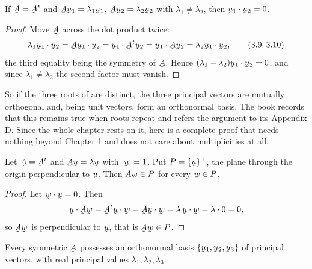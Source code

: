 \begin{theorem}[Orthogonality]\label{thm:orth}
If $\bA=\bA^{t}$ and $\bA\bu_{1}=\lambda_{1}\bu_{1}$,
$\bA\bu_{2}=\lambda_{2}\bu_{2}$ with $\lambda_{1}\neq\lambda_{2}$, then
$\ip{\bu_{1}}{\bu_{2}}=0$.
\end{theorem}

\begin{proof}
Move $\bA$ across the dot product twice:
\begin{equation}
   \lambda_{1}\ip{\bu_{1}}{\bu_{2}}
   =\ip{\bA\bu_{1}}{\bu_{2}}
   =\ip{\bu_{1}}{\bA^{t}\bu_{2}}
   =\ip{\bu_{1}}{\bA\bu_{2}}
   =\lambda_{2}\ip{\bu_{1}}{\bu_{2}},
   \tag{3.9--3.10}\label{eq:3.9}
\end{equation}
the third equality being the symmetry of $\bA$. Hence
$(\lambda_{1}-\lambda_{2})\ip{\bu_{1}}{\bu_{2}}=0$, and since
$\lambda_{1}\neq\lambda_{2}$ the second factor must vanish.
\end{proof}

So if the three roots of  are distinct, the three principal vectors
are mutually orthogonal and, being unit vectors, form an orthonormal basis.
The book records that this remains true when roots repeat and refers the
argument to its Appendix D. Since the whole chapter rests on it, here is a
complete proof that needs nothing beyond Chapter 1 and does not care about
multiplicities at all.

\begin{lemma}\label{lem:invariant}
Let $\bA=\bA^{t}$ and $\bA\bu=\lambda\bu$ with $|\bu|=1$. Put
$P=\{\bu\}^{\perp}$, the plane through the origin perpendicular to $\bu$.
Then $\bA\bw\in P$ for every $\bw\in P$.
\end{lemma}

\begin{proof}
Let $\ip\bw\bu=0$. Then
\[
   \ip{\bu}{\bA\bw}=\ip{\bA^{t}\bu}{\bw}=\ip{\bA\bu}{\bw}
   =\lambda\,\ip\bu\bw=\lambda\cdot0=0 ,
\]
so $\bA\bw$ is perpendicular to $\bu$, that is $\bA\bw\in P$.
\end{proof}

\begin{theorem}\label{thm:spectral}
Every symmetric $\bA$ possesses an orthonormal basis $\{\bu_{1},\bu_{2},
\bu_{3}\}$ of principal vectors, with real principal values
$\lambda_{1},\lambda_{2},\lambda_{3}$.
\end{theorem}

